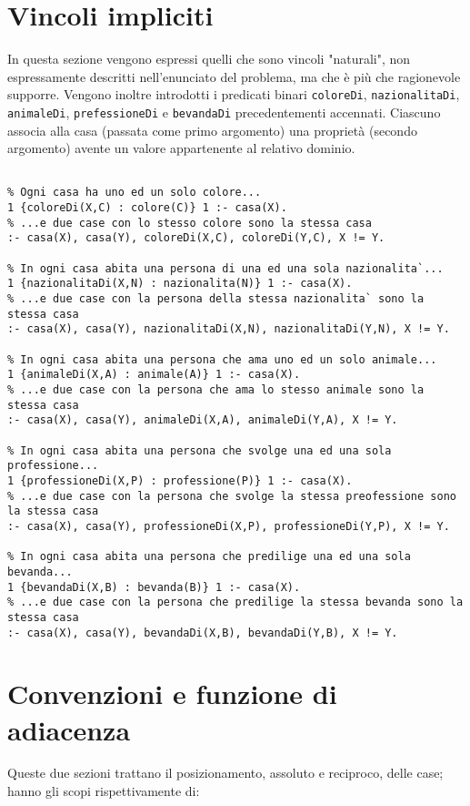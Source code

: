 \section{Vincoli impliciti}
In questa sezione vengono espressi quelli che sono vincoli "naturali", non espressamente descritti nell'enunciato del problema, ma che è più che ragionevole supporre. Vengono inoltre introdotti i predicati binari \texttt{coloreDi}, \texttt{nazionalitaDi}, \texttt{animaleDi}, \texttt{prefessioneDi} e \texttt{bevandaDi} precedentementi accennati. Ciascuno associa alla casa (passata come primo argomento) una proprietà (secondo argomento) avente un valore appartenente al relativo dominio.
\begin{lstlisting}[frame=tb]
%% Vincoli impliciti

% Ogni casa ha uno ed un solo colore...
1 {coloreDi(X,C) : colore(C)} 1 :- casa(X).
% ...e due case con lo stesso colore sono la stessa casa
:- casa(X), casa(Y), coloreDi(X,C), coloreDi(Y,C), X != Y.

% In ogni casa abita una persona di una ed una sola nazionalita`...
1 {nazionalitaDi(X,N) : nazionalita(N)} 1 :- casa(X).
% ...e due case con la persona della stessa nazionalita` sono la stessa casa
:- casa(X), casa(Y), nazionalitaDi(X,N), nazionalitaDi(Y,N), X != Y.

% In ogni casa abita una persona che ama uno ed un solo animale...
1 {animaleDi(X,A) : animale(A)} 1 :- casa(X).
% ...e due case con la persona che ama lo stesso animale sono la stessa casa
:- casa(X), casa(Y), animaleDi(X,A), animaleDi(Y,A), X != Y.

% In ogni casa abita una persona che svolge una ed una sola professione...
1 {professioneDi(X,P) : professione(P)} 1 :- casa(X).
% ...e due case con la persona che svolge la stessa preofessione sono la stessa casa
:- casa(X), casa(Y), professioneDi(X,P), professioneDi(Y,P), X != Y.

% In ogni casa abita una persona che predilige una ed una sola bevanda...
1 {bevandaDi(X,B) : bevanda(B)} 1 :- casa(X).
% ...e due case con la persona che predilige la stessa bevanda sono la stessa casa
:- casa(X), casa(Y), bevandaDi(X,B), bevandaDi(Y,B), X != Y.
\end{lstlisting}

\section{Convenzioni e funzione di adiacenza}
Queste due sezioni trattano il posizionamento, assoluto e reciproco, delle case; hanno gli scopi rispettivamente di: 

